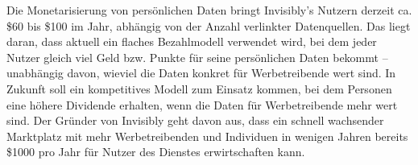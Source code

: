 \noindent Die Monetarisierung von persönlichen Daten bringt Invisibly's Nutzern derzeit ca. \$60 bis \$100 im Jahr, abhängig von der Anzahl verlinkter Datenquellen. Das liegt daran, dass aktuell ein flaches Bezahlmodell verwendet wird, bei dem jeder Nutzer gleich viel Geld bzw. Punkte für seine persönlichen Daten bekommt -- unabhängig davon, wieviel die Daten konkret für Werbetreibende wert sind. In Zukunft soll ein kompetitives Modell zum Einsatz kommen, bei dem Personen eine höhere Dividende erhalten, wenn die Daten für Werbetreibende mehr wert sind. \cite{pymntsInvisibly_2021} Der Gründer von Invisibly geht davon aus, dass ein schnell wachsender Marktplatz mit mehr Werbetreibenden und Individuen in wenigen Jahren bereits \$1000 pro Jahr für Nutzer des Dienstes erwirtschaften kann. \cite{techRadarInvisibly_2021} 
